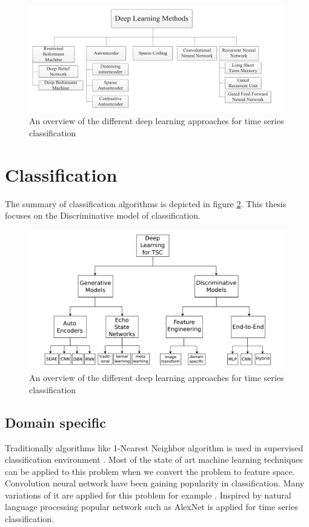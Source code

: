      \begin{figure}[h]
     	\centering
     	\includegraphics[width=1\linewidth]{images/dlm.png}
     	\caption{An overview of the different deep learning approaches for time series classification \cite{nweke2018deep}}
     	\label{l01}
     \end{figure}
     
     
     \section{Classification}
     The summary of classification algorithms is depicted in figure \ref{l0}. This thesis focuses on the Discriminative model of classification.
     
      \begin{figure}[h]
      	\centering
      	\includegraphics[width=1\linewidth]{images/tsc.png}
      	\caption{An overview of the different deep learning approaches for time series classification \cite{ismail2019deep}}
      	\label{l0}
      \end{figure}
     
     \subsection{Domain specific}
     Traditionally algorithms like 1-Nearest Neighbor algorithm is used in supervised classification environment \cite{bagnall2012transformation}. Most of the state of art machine learning techniques can be applied to this problem when we convert the problem to feature space. 
    Convolution neural network have been gaining popularity in classification. Many variations of it are applied for this problem for example \cite{wang2017time}. 
     Inspired by natural language processing popular network such as AlexNet \cite{alom2018history} is applied for time series classification.
     
